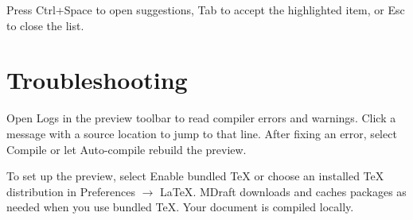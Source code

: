 \documentclass[11pt]{article}
\begin{document}
Press \textsf{Ctrl+Space} to open suggestions, \textsf{Tab} to accept the highlighted item, or \textsf{Esc} to close the list.

\section{Troubleshooting}

Open \textsf{Logs} in the preview toolbar to read compiler errors and warnings. Click a message with a source location to jump to that line. After fixing an error, select \textsf{Compile} or let Auto-compile rebuild the preview.

To set up the preview, select \textsf{Enable bundled TeX} or choose an installed TeX distribution in \textsf{Preferences \(\to\) LaTeX}. MDraft downloads and caches packages as needed when you use bundled TeX. Your document is compiled locally.
\end{document}
